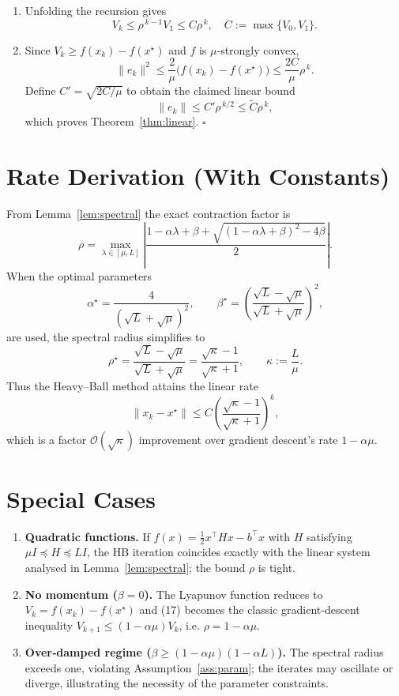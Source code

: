 \documentclass{article}
\begin{document}
\begin{enumerate}
\item[Step 16.]  Unfolding the recursion gives
\[
V_k\le\rho^{\,k-1}V_1\le C\rho^{\,k},
\quad C:=\max\{V_0,V_1\}.
\tag{18}
\]

\item[Step 17.]  Since $V_k\ge f(x_k)-f(x^\star)$ and $f$ is $\mu$‑strongly convex,
\[
\|e_k\|^2\le \frac{2}{\mu}\bigl(f(x_k)-f(x^\star)\bigr)
\le \frac{2C}{\mu}\rho^{\,k}.
\tag{19}
\]
Define $C'=\sqrt{2C/\mu}$ to obtain the claimed linear bound
\[
\|e_k\|\le C'\rho^{\,k/2}\le \tilde C\rho^{\,k},
\]
which proves Theorem~\ref{thm:linear}. \hfill $\square$
\end{enumerate}

\section*{Rate Derivation (With Constants)}
From Lemma~\ref{lem:spectral} the exact contraction factor is
\[
\rho = \max_{\lambda\in[\mu,L]}
\left|\frac{1-\alpha\lambda+\beta+\sqrt{(1-\alpha\lambda+\beta)^2-4\beta}}{2}\right|.
\]
When the optimal parameters
\[
\alpha^\star=\frac{4}{(\sqrt{L}+\sqrt{\mu})^2},
\qquad
\beta^\star=\left(\frac{\sqrt{L}-\sqrt{\mu}}{\sqrt{L}+\sqrt{\mu}}\right)^2,
\]
are used, the spectral radius simplifies to
\[
\rho^\star=\frac{\sqrt{L}-\sqrt{\mu}}{\sqrt{L}+\sqrt{\mu}}
= \frac{\sqrt{\kappa}-1}{\sqrt{\kappa}+1},
\qquad \kappa:=\frac{L}{\mu}.
\]
Thus the Heavy–Ball method attains the linear rate
\[
\|x_k-x^\star\|\le C\left(\frac{\sqrt{\kappa}-1}{\sqrt{\kappa}+1}\right)^{\!k},
\]
which is a factor $\mathcal O(\sqrt{\kappa})$ improvement over gradient descent’s rate $1-\alpha\mu$.

\section*{Special Cases}
\begin{enumerate}[label=\alph*.]
\item \textbf{Quadratic functions.} If $f(x)=\frac12 x^\top H x - b^\top x$ with $H$ satisfying $\mu I\preceq H\preceq L I$, the HB iteration coincides exactly with the linear system analysed in Lemma~\ref{lem:spectral}; the bound $\rho$ is tight.
\item \textbf{No momentum ($\beta=0$).} The Lyapunov function reduces to $V_k=f(x_k)-f(x^\star)$ and (17) becomes the classic gradient‑descent inequality $V_{k+1}\le(1-\alpha\mu)V_k$, i.e. $\rho=1-\alpha\mu$.
\item \textbf{Over‑damped regime ($\beta\ge (1-\alpha\mu)(1-\alpha L)$).} The spectral radius exceeds one, violating Assumption~\ref{ass:param}; the iterates may oscillate or diverge, illustrating the necessity of the parameter constraints.
\end{enumerate}
\end{document}
